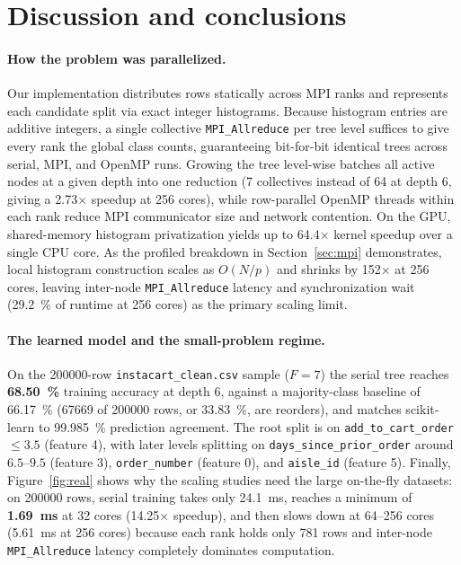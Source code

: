 \documentclass[11pt]{article}
\begin{document}
\section{Discussion and conclusions}\label{sec:discuss}

\paragraph{How the problem was parallelized.}
Our implementation distributes rows statically across MPI ranks and represents each candidate split via exact integer histograms. Because histogram entries are additive integers, a single collective \texttt{MPI\_Allreduce} per tree level suffices to give every rank the global class counts, guaranteeing bit-for-bit identical trees across serial, MPI, and OpenMP runs. Growing the tree level-wise batches all active nodes at a given depth into one reduction (\num{7} collectives instead of \num{64} at depth \num{6}, giving a \num{2.73}$\times$ speedup at \num{256} cores), while row-parallel OpenMP threads within each rank reduce MPI communicator size and network contention. On the GPU, shared-memory histogram privatization yields up to \num{64.4}$\times$ kernel speedup over a single CPU core. As the profiled breakdown in Section~\ref{sec:mpi} demonstrates, local histogram construction scales as $O(N/p)$ and shrinks by \num{152}$\times$ at \num{256} cores, leaving inter-node \texttt{MPI\_Allreduce} latency and synchronization wait (\SI{29.2}{\percent} of runtime at \num{256} cores) as the primary scaling limit.

\paragraph{The learned model and the small-problem regime.}
On the \num{200000}-row \texttt{instacart\_clean.csv} sample ($F=\num{7}$) the serial tree reaches \textbf{\SI{68.50}{\percent}} training accuracy at depth \num{6}, against a majority-class baseline of \SI{66.17}{\percent} (\num{67669} of \num{200000} rows, or \SI{33.83}{\percent}, are reorders), and matches scikit-learn to \SI{99.985}{\percent} prediction agreement. The root split is on \texttt{add\_to\_cart\_order} $\le 3.5$ (feature \num{4}), with later levels splitting on \texttt{days\_since\_prior\_order} around $6.5$--$9.5$ (feature \num{3}), \texttt{order\_number} (feature \num{0}), and \texttt{aisle\_id} (feature \num{5}). Finally, Figure~\ref{fig:real} shows why the scaling studies need the large on-the-fly datasets: on \num{200000} rows, serial training takes only \SI{24.1}{ms}, reaches a minimum of \textbf{\SI{1.69}{ms}} at \num{32} cores (\num{14.25}$\times$ speedup), and then slows down at \num{64}--\num{256} cores (\SI{5.61}{ms} at \num{256} cores) because each rank holds only \num{781} rows and inter-node \texttt{MPI\_Allreduce} latency completely dominates computation.
\end{document}
